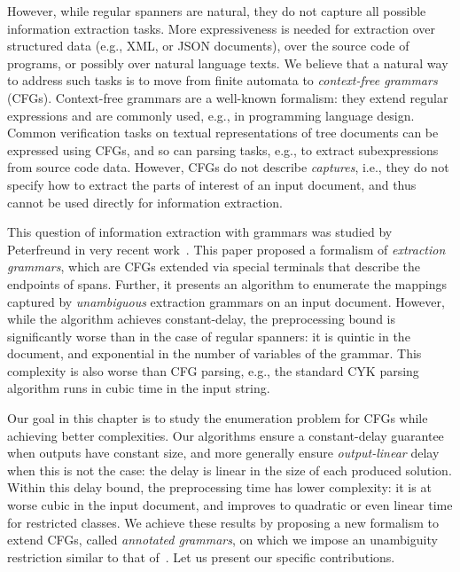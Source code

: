 
However, while regular spanners are natural, they do not capture all
possible information extraction tasks. More
expressiveness is needed for extraction over structured data (e.g., XML,
or JSON documents), over the source code of programs, or possibly over
natural language texts. We believe that a natural way to address such
tasks is to move from finite automata to \emph{context-free grammars}
(CFGs). Context-free grammars are a well-known formalism: they extend regular
expressions and are commonly used, e.g., in programming language
design. Common verification tasks on textual representations of tree
documents can be expressed using CFGs, and so can parsing tasks, e.g.,
to extract subexpressions from source code data. However, CFGs do not
describe \emph{captures}, i.e., they do not specify how to extract the
parts of interest of an input document, and thus cannot be used
directly for information extraction.

%
%

This question of information extraction with grammars was studied by Peterfreund in very recent work~\cite{Peterfreund21}. This paper proposed a formalism of \emph{extraction grammars}, which are CFGs extended via special terminals that describe the endpoints of spans.
Further, it presents an algorithm to enumerate the mappings captured by
\emph{unambiguous} extraction grammars on an input document.
However, while the algorithm achieves constant-delay, the preprocessing bound is significantly worse than in the case of regular spanners: it is quintic in the document, and exponential in the number of variables of the grammar. This complexity is also worse than CFG parsing, e.g., the standard CYK parsing algorithm runs in cubic time in the input string.

%
%
%

Our goal in this chapter is to study the enumeration problem for CFGs while
achieving better complexities. Our algorithms ensure a constant-delay
guarantee when outputs have constant size, and more generally ensure
\emph{output-linear} delay when this is not the case: the delay is linear in the
size of each produced solution. Within this delay bound, the preprocessing
time has lower complexity: it is at worse cubic in the
input document, and improves to quadratic or even linear time for restricted
classes. We achieve these results by proposing a new formalism to extend CFGs, called
\emph{annotated grammars}, on which we impose an unambiguity restriction similar
to that of~\cite{Peterfreund21}. Let us present our specific contributions.

